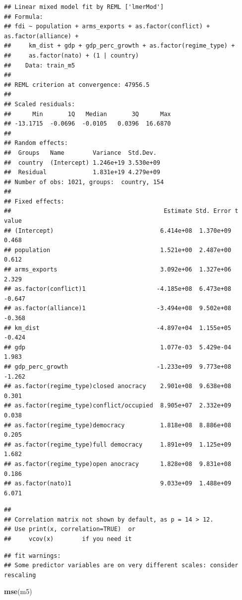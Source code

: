 \documentclass[11pt,]{article}
\newenvironment{Shaded}{\begin{snugshade}}{\end{snugshade}}
\newcommand{\KeywordTok}[1]{\textcolor[rgb]{0.13,0.29,0.53}{\textbf{#1}}}
\newcommand{\NormalTok}[1]{#1}
\begin{document}
\begin{verbatim}
## Linear mixed model fit by REML ['lmerMod']
## Formula: 
## fdi ~ population + arms_exports + as.factor(conflict) + as.factor(alliance) +  
##     km_dist + gdp + gdp_perc_growth + as.factor(regime_type) +  
##     as.factor(nato) + (1 | country)
##    Data: train_m5
## 
## REML criterion at convergence: 47956.5
## 
## Scaled residuals: 
##      Min       1Q   Median       3Q      Max 
## -13.1715  -0.0696  -0.0105   0.0396  16.6870 
## 
## Random effects:
##  Groups   Name        Variance  Std.Dev. 
##  country  (Intercept) 1.246e+19 3.530e+09
##  Residual             1.831e+19 4.279e+09
## Number of obs: 1021, groups:  country, 154
## 
## Fixed effects:
##                                           Estimate Std. Error t value
## (Intercept)                              6.414e+08  1.370e+09   0.468
## population                               1.521e+00  2.487e+00   0.612
## arms_exports                             3.092e+06  1.327e+06   2.329
## as.factor(conflict)1                    -4.185e+08  6.473e+08  -0.647
## as.factor(alliance)1                    -3.494e+08  9.502e+08  -0.368
## km_dist                                 -4.897e+04  1.155e+05  -0.424
## gdp                                      1.077e-03  5.429e-04   1.983
## gdp_perc_growth                         -1.233e+09  9.773e+08  -1.262
## as.factor(regime_type)closed anocracy    2.901e+08  9.638e+08   0.301
## as.factor(regime_type)conflict/occupied  8.905e+07  2.332e+09   0.038
## as.factor(regime_type)democracy          1.818e+08  8.886e+08   0.205
## as.factor(regime_type)full democracy     1.891e+09  1.125e+09   1.682
## as.factor(regime_type)open anocracy      1.828e+08  9.831e+08   0.186
## as.factor(nato)1                         9.033e+09  1.488e+09   6.071
\end{verbatim}

\begin{verbatim}
## 
## Correlation matrix not shown by default, as p = 14 > 12.
## Use print(x, correlation=TRUE)  or
##     vcov(x)        if you need it
\end{verbatim}

\begin{verbatim}
## fit warnings:
## Some predictor variables are on very different scales: consider rescaling
\end{verbatim}

\begin{Shaded}
\begin{Highlighting}[]
\KeywordTok{mse}\NormalTok{(m5)}
\end{Highlighting}
\end{Shaded}
\end{document}
